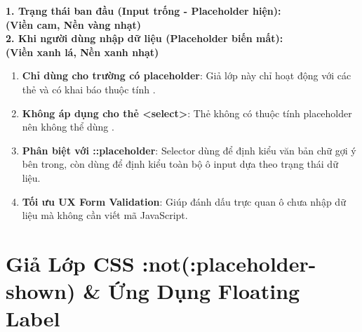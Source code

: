 \begin{browserWindow}
\sffamily\small
\textbf{1. Trạng thái ban đầu (Input trống - Placeholder hiện):}\\[2pt]
 \quad \textcolor{accentOrange}{\bfseries (Viền cam, Nền vàng nhạt)}\\[8pt]
\textbf{2. Khi người dùng nhập dữ liệu (Placeholder biến mất):}\\[2pt]
 \quad \textcolor{green!60!black}{\bfseries (Viền xanh lá, Nền xanh nhạt)}
\end{browserWindow}

\begin{warnBox}
\begin{enumerate}[leftmargin=1.5em, itemsep=4pt, parsep=0pt]
    \item \textbf{Chỉ dùng cho trường có placeholder}: Giả lớp này chỉ hoạt động với các thẻ  và  có khai báo thuộc tính .
    \item \textbf{Không áp dụng cho thẻ <select>}: Thẻ  không có thuộc tính placeholder nên không thể dùng .
    \item \textbf{Phân biệt với ::placeholder}: Selector  dùng để định kiểu văn bản chữ gợi ý bên trong, còn  dùng để định kiểu toàn bộ ô input dựa theo trạng thái dữ liệu.
    \item \textbf{Tối ưu UX Form Validation}: Giúp đánh dấu trực quan ô chưa nhập dữ liệu mà không cần viết mã JavaScript.
\end{enumerate}
\end{warnBox}

\section{Giả Lớp CSS :not(:placeholder-shown) \& Ứng Dụng Floating Label}
\label{sec:css_not_placeholder_shown}

